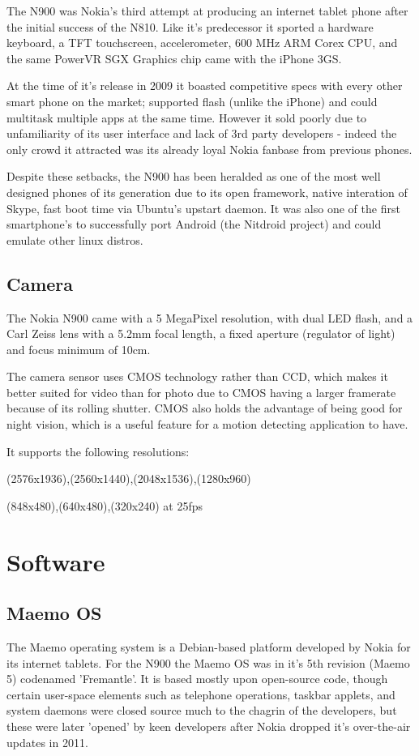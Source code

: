 The N900 was Nokia's third attempt at producing an internet tablet phone after the initial success of the N810. Like it's predecessor it sported a hardware keyboard, a TFT touchscreen, accelerometer, 600 MHz ARM Corex CPU, and the same PowerVR SGX Graphics chip came with the iPhone 3GS.

At the time of it's release in 2009 it boasted competitive specs with every other smart phone on the market; supported flash (unlike the iPhone) and could multitask multiple apps at the same time. However it sold poorly due to unfamiliarity of its user interface and lack of 3rd party developers - indeed the only crowd it attracted was its already loyal Nokia fanbase from previous phones.

Despite these setbacks, the N900 has been heralded as one of the most well designed phones of its generation due to its open framework, native interation of Skype, fast boot time via Ubuntu's upstart daemon. It was also one of the first smartphone's to successfully port Android (the Nitdroid project) and could emulate other linux distros.

\subsection{Camera}
The Nokia N900 came with a 5 MegaPixel resolution, with dual LED flash, and a Carl Zeiss lens with a 5.2mm focal length, a fixed aperture (regulator of light) and focus minimum of 10cm.

The camera sensor uses CMOS technology rather than CCD, which makes it better suited for video than for photo due to CMOS having a larger framerate because of its rolling shutter. CMOS also holds the advantage of being good for night vision, which is a useful feature for a motion detecting application to have.

 It supports the following resolutions:
\begin{description}
\vspace{-5pt}
\item [Image:] (2576x1936),(2560x1440),(2048x1536),(1280x960)
\vspace{-5pt}
\item [Video:] (848x480),(640x480),(320x240) at 25fps
\end{description}

\section{Software}
\subsection{Maemo OS}
The Maemo operating system is a Debian-based platform developed by Nokia for its internet tablets. For the N900 the Maemo OS was in it's 5th revision (Maemo 5) codenamed 'Fremantle'. It is based mostly upon open-source code, though certain user-space elements such as telephone operations, taskbar applets, and system daemons were closed source much to the chagrin of the developers, but these were later 'opened' by keen developers after Nokia dropped it's over-the-air updates in 2011.

